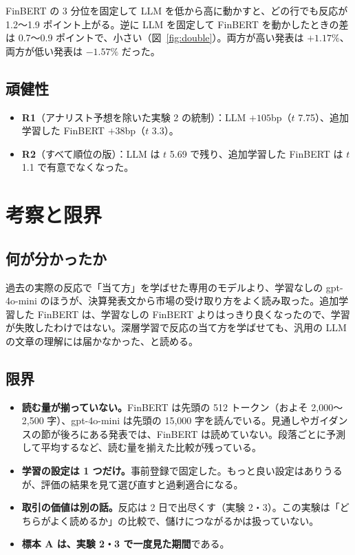 \documentclass[xelatex,ja=standard,jafont=haranoaji,a4paper,10pt,openany]{bxjsreport}
\newcommand{\figref}[1]{図~\ref{#1}}
\begin{document}
FinBERT の 3 分位を固定して LLM を低から高に動かすと、どの行でも反応が 1.2〜1.9 ポイント上がる。逆に LLM を固定して FinBERT を動かしたときの差は 0.7〜0.9 ポイントで、小さい（\figref{fig:double}）。両方が高い発表は $+1.17\%$、両方が低い発表は $-1.57\%$ だった。

\section{頑健性}

\begin{itemize}
\item \textbf{R1}（アナリスト予想を除いた実験 2 の統制）：LLM $+105$bp（$t$ 7.75）、追加学習した FinBERT $+38$bp（$t$ 3.3）。
\item \textbf{R2}（すべて順位の版）：LLM は $t$ 5.69 で残り、追加学習した FinBERT は $t$ 1.1 で有意でなくなった。
\end{itemize}

\chapter{考察と限界}\label{ch:discussion}

\section{何が分かったか}

過去の実際の反応で「当て方」を学ばせた専用のモデルより、学習なしの gpt-4o-mini のほうが、決算発表文から市場の受け取り方をよく読み取った。追加学習した FinBERT は、学習なしの FinBERT よりはっきり良くなったので、学習が失敗したわけではない。深層学習で反応の当て方を学ばせても、汎用の LLM の文章の理解には届かなかった、と読める。

\section{限界}

\begin{itemize}
\item \textbf{読む量が揃っていない。}FinBERT は先頭の 512 トークン（およそ 2,000〜2,500 字）、gpt-4o-mini は先頭の 15,000 字を読んでいる。見通しやガイダンスの節が後ろにある発表では、FinBERT は読めていない。段落ごとに予測して平均するなど、読む量を揃えた比較が残っている。
\item \textbf{学習の設定は 1 つだけ。}事前登録で固定した。もっと良い設定はありうるが、評価の結果を見て選び直すと過剰適合になる。
\item \textbf{取引の価値は別の話。}反応は 2 日で出尽くす（実験 2・3）。この実験は「どちらがよく読めるか」の比較で、儲けにつながるかは扱っていない。
\item \textbf{標本 A は、実験 2・3 で一度見た期間}である。
\end{itemize}
\end{document}
